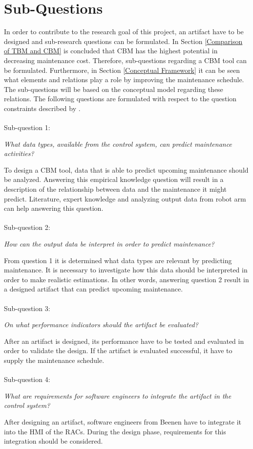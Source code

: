 \section{Sub-Questions} \label{Sub-Questions}
In order to contribute to the research goal of this project, an artifact have to be designed and sub-research questions can be formulated. In Section \ref{Comparison of TBM and CBM} is concluded that CBM has the highest potential in decreasing maintenance cost. Therefore, sub-questions regarding a CBM tool can be formulated. Furthermore, in Section \ref{Conceptual Framework} it can be seen what elements and relations play a role by improving the maintenance schedule. The sub-questions will be based on the conceptual model regarding these relations. The following questions are formulated with respect to the question constraints described by \citet{Wieringa2014}. \\ \\ 
Sub-question 1:
\begin{center}
\textit{What data types, available from the control system, can predict maintenance activities?}
\end{center}
To design a CBM tool, data that is able to predict upcoming maintenance should be analyzed. Answering this empirical knowledge question will result in a description of the relationship between data and the maintenance it might predict. Literature, expert knowledge and analyzing output data from robot arm can help answering this question. \\ \\
Sub-question 2:
\begin{center}
\textit{How can the output data be interpret in order to predict maintenance?}
\end{center}
From question 1 it is determined what data types are relevant by predicting maintenance. It is necessary to investigate how this data should be interpreted in order to make realistic estimations. In other words, answering question 2 result in a designed artifact that can predict upcoming maintenance. \\ \\
Sub-question 3:
\begin{center}
\textit{On what performance indicators should the artifact be evaluated?}
\end{center}
After an artifact is designed, its performance have to be tested and evaluated in order to validate the design. If the artifact is evaluated successful, it have to supply the maintenance schedule.\\ \\
Sub-question 4:
\begin{center}
\textit{What are requirements for software engineers to integrate the artifact in the control system?}
\end{center}
After designing an artifact, software engineers from Beenen have to integrate it into the HMI of the RACs. During the design phase, requirements for this integration should be considered.


